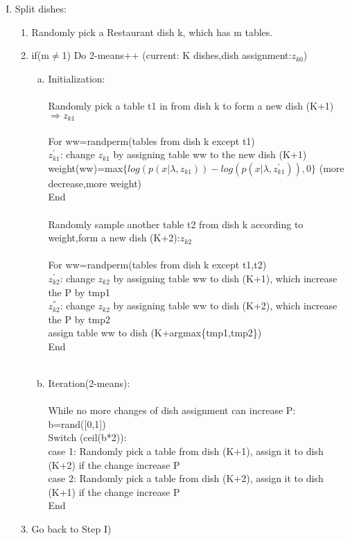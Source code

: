 \documentclass{article}
\begin{document}
\begin{spacing}{1.1}
\begin{enumerate}[(I)]
\item Split dishes:
\begin{enumerate}[(1)] 
\item Randomly pick a Restaurant dish k, which has m tables.
\item if(m$\neq$1) Do 2-means++ (current: K dishes,dish assignment:$z_{k0}$)
\begin{enumerate}[(a)]
\item Initialization:\\ \\
Randomly pick a table t1 in from dish k to form a new dish (K+1)$\Rightarrow z_{k1}$ \\ \\
For ww=randperm(tables from dish k except t1) \\ 
$z_{k1}^{'}$: change $z_{k1}$ by assigning table ww to the new dish (K+1) \\
weight(ww)=max$\{log(p(x|\lambda,z_{k1}))-log(p(x|\lambda,z_{k1}^{'})),0\}$   (more decrease,more weight) \\ 
End \\ \\
Randomly sample another table t2 from dish k according to weight,form a new dish (K+2):$z_{k2}$\\ \\

For ww=randperm(tables from dish k except t1,t2) \\ 
$z_{k2}^{'}$: change $z_{k2}$ by assigning table ww to dish (K+1), which increase the P by tmp1\\
$z_{k2}^{''}$: change $z_{k2}$ by assigning table ww to dish (K+2), which increase the P by tmp2 \\
assign table ww to dish (K+argmax\{tmp1,tmp2\})\\
End \\ \\


\item Iteration(2-means):\\ \\
While no more changes of dish assignment can increase P:\\
b=rand([0,1]) \\
Switch (ceil(b*2)):\\
case 1: Randomly pick a table from dish (K+1), assign it to dish (K+2) if the change increase P\\
case 2: Randomly pick a table from dish (K+2), assign it to dish (K+1) if the change increase P\\
End\\
\end{enumerate}  
\item Go back to Step I)
\end{enumerate}  




\end{enumerate}
\end{spacing}
\end{document}
